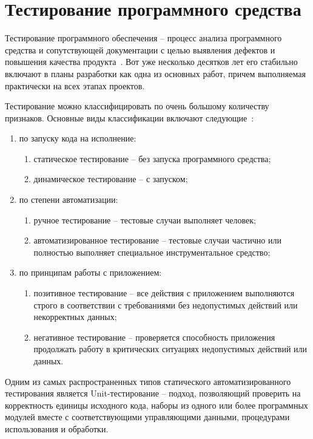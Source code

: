\section{Тестирование программного средства}
\label{sec:testing}

Тестирование программного обеспечения -- процесс анализа программного средства и сопутствующей документации с целью выявления дефектов и повышения качества продукта~\cite{kulikov_testing}.
Вот уже несколько десятков лет его стабильно включают в планы разработки как одна из основных работ, причем выполняемая практически на всех этапах проектов.

Тестирование можно классифицировать по очень большому количеству признаков. Основные виды классификации включают следующие~\cite{kulikov_testing}:

\begin{enumerate}
    \item по запуску кода на исполнение:
    \begin{enumerate}
        \item статическое тестирование -- без запуска программного средства;
        \item динамическое тестирование -- с запуском;
    \end{enumerate}
    \item по степени автоматизации:
    \begin{enumerate}
        \item ручное тестирование -- тестовые случаи выполняет человек;
        \item автоматизированное тестирование -- тестовые случаи частично или полностью выполняет специальное инструментальное средство;
    \end{enumerate}
    \item по принципам работы с приложением:
    \begin{enumerate}
        \item позитивное тестирование -- все действия с приложением выполняются строго в соответствии с требованиями без недопустимых действий или некорректных данных;
        \item негативное тестирование -- проверяется способность приложения продолжать работу в критических ситуациях недопустимых действий или данных.
    \end{enumerate}
\end{enumerate}

Одним из самых распространенных типов статического автоматизированного тестирования является Unit-тестирование -- подход, позволяющий проверить на корректность единицы исходного кода, наборы из одного или более программных модулей вместе с соответствующими управляющими данными, процедурами использования и обработки.

